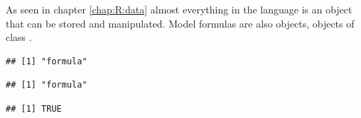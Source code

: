 \documentclass[krantz2]{krantz}\usepackage{knitr}%
\begin{document}
As seen in chapter \ref{chap:R:data} almost everything in the \Rlang language is an object that can be stored and manipulated. Model formulas are also objects, objects of class .

\begin{knitrout}\footnotesize
{}\color{fgcolor}\begin{kframe}
\begin{alltt}
 \hlopt{~} 
\end{alltt}
\begin{verbatim}
## [1] "formula"
\end{verbatim}
\end{kframe}
\end{knitrout}

\begin{knitrout}\footnotesize
{}\color{fgcolor}\begin{kframe}
\begin{alltt}
 \hlkwb{<-}  \hlopt{~} 
\end{alltt}
\begin{verbatim}
## [1] "formula"
\end{verbatim}
\begin{alltt}
 \hlstd{)}
\end{alltt}
\begin{verbatim}
## [1] TRUE
\end{verbatim}
\end{kframe}
\end{knitrout}
\end{document}
